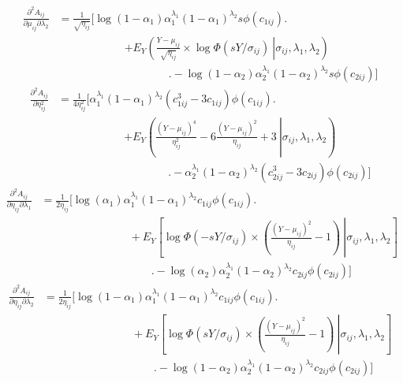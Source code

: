 \documentclass[
  american,
  man, donotrepeattitle,floatsintext]{apa7}
\begin{document}
\begin{align}
\frac{\partial^2 A_{ij}}{\partial \mu_{ij} \partial \lambda_2} &= \frac{1}{\sqrt{\eta_{ij}}} \biggl[\log(1 - \alpha_1) \alpha_1^{\lambda_1} (1 - \alpha_1)^{\lambda_2} s \phi(c_{1ij}) \biggr. \nonumber \\
& \qquad \qquad \qquad \left. + E_Y\left(\left.\frac{Y - \mu_{ij}}{\sqrt{\eta_{ij}}} \times \log \Phi(s Y / \sigma_{ij}) \ \right| \sigma_{ij},  \lambda_1,\lambda_2\right) \right. \nonumber \\ 
& \qquad \qquad \qquad \qquad \qquad \biggl. - \log(1 - \alpha_2) \alpha_2^{\lambda_1} (1 - \alpha_2)^{\lambda_2} s \phi(c_{2ij}) \biggr]
\end{align}
\begin{align}
\frac{\partial^2 A_{ij}}{\partial \eta_{ij}^2} &= \frac{1}{4 \eta_{ij}^2} \biggl[  \alpha_1^{\lambda_1}(1 - \alpha_1)^{\lambda_2} (c_{1ij}^3 - 3 c_{1ij}) \phi(c_{1ij}) \biggr. \nonumber \\
& \qquad \qquad \qquad \left. + E_Y\left(\left.\frac{(Y - \mu_{ij})^4}{\eta_{ij}^2} - 6 \frac{(Y - \mu_{ij})^2}{\eta_{ij}} + 3 \ \right| \sigma_{ij},  \lambda_1, \lambda_2 \right) \right. \nonumber \\ 
& \qquad \qquad \qquad \qquad \qquad \biggl. - \alpha_2^{\lambda_1} (1 - \alpha_2)^{\lambda_2} (c_{2ij}^3 - 3 c_{2ij}) \phi(c_{2ij}) \biggr]
\end{align}
\begin{align}
\frac{\partial^2 A_{ij}}{\partial \eta_{ij} \partial \lambda_1} &= \frac{1}{2\eta_{ij}} \biggl[\log(\alpha_1) \alpha_1^{\lambda_1} (1 - \alpha_1)^{\lambda_2} c_{1ij} \phi(c_{1ij}) \biggr. \nonumber \\
& \left. \qquad \qquad \qquad \qquad + E_Y\left[\left. \log \Phi(-s Y / \sigma_{ij}) \times \left(\frac{(Y - \mu_{ij})^2}{\eta_{ij}} - 1\right) \ \right| \sigma_{ij}, \lambda_1,\lambda_2\right] \right. \nonumber \\ 
& \qquad \qquad \qquad \qquad \qquad \biggl. - \log(\alpha_2) \alpha_2^{\lambda_1} (1 - \alpha_2)^{\lambda_2} c_{2ij} \phi(c_{2ij}) \biggr] 
\end{align}
\begin{align}
\frac{\partial^2 A_{ij}}{\partial \eta_{ij} \partial \lambda_2} &= \frac{1}{2\eta_{ij}} \biggl[\log(1 - \alpha_1) \alpha_1^{\lambda_1} (1 - \alpha_1)^{\lambda_2} c_{1ij} \phi(c_{1ij}) \biggr. \nonumber \\
& \left. \qquad \qquad \qquad \qquad + E_Y\left[\left. \log \Phi(s Y / \sigma_{ij}) \times \left(\frac{(Y - \mu_{ij})^2}{\eta_{ij}} - 1\right) \ \right| \sigma_{ij}, \lambda_1,\lambda_2\right] \right. \nonumber \\ 
& \qquad \qquad \qquad \qquad \qquad \biggl. - \log(1 - \alpha_2) \alpha_2^{\lambda_1} (1 - \alpha_2)^{\lambda_2} c_{2ij} \phi(c_{2ij}) \biggr]
\end{align}
\end{document}
